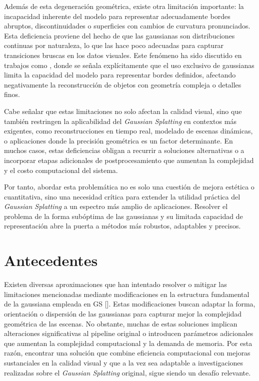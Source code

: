 Además de esta degeneración geométrica, existe otra limitación importante: la incapacidad inherente del modelo para representar adecuadamente 
bordes abruptos, discontinuidades o superficies con cambios de curvatura pronunciados. Esta deficiencia proviene del hecho de que las gaussianas 
son distribuciones continuas por naturaleza, lo que las hace poco adecuadas para capturar transiciones bruscas en los datos visuales. Este fenómeno 
ha sido discutido en trabajos como \cite{qu2024discgsdiscontinuityawaregaussiansplatting}, donde se señala explícitamente que el 
uso exclusivo de gaussianas limita la capacidad del modelo para representar bordes definidos, afectando negativamente la reconstrucción 
de objetos con geometría compleja o detalles finos.

Cabe señalar que estas limitaciones no solo afectan la calidad visual, sino que también restringen la aplicabilidad del \textit{Gaussian Splatting} en 
contextos más exigentes, como reconstrucciones en tiempo real, modelado de escenas dinámicas, o aplicaciones donde la precisión geométrica es 
un factor determinante. En muchos casos, estas deficiencias obligan a recurrir a soluciones alternativas o a incorporar etapas adicionales de 
postprocesamiento que aumentan la complejidad y el costo computacional del sistema.

Por tanto, abordar esta problemática no es solo una cuestión de mejora estética o cuantitativa, sino una necesidad crítica para extender la 
utilidad práctica del \textit{Gaussian Splatting} a un espectro más amplio de aplicaciones. Resolver el problema de la forma subóptima de las gaussianas 
y su limitada capacidad de representación abre la puerta a métodos más robustos, adaptables y precisos.

\section{Antecedentes}
Existen diversas aproximaciones que han intentado resolver o mitigar las limitaciones mencionadas mediante modificaciones en la estructura 
fundamental de la gaussiana empleada en GS 
[\cite{qu2024discgsdiscontinuityawaregaussiansplatting, li20243d, huang2025deformableradialkernelsplatting,held20243dconvexsplattingradiance}]. 
Estas modificaciones buscan adaptar la forma, orientación o dispersión de las gaussianas para capturar mejor la complejidad geométrica de las escenas. 
No obstante, muchas de estas soluciones implican alteraciones significativas al pipeline original o introducen parámetros adicionales que aumentan la 
complejidad computacional y la demanda de memoria. 
Por esta razón, encontrar una solución que combine eficiencia computacional con mejoras sustanciales en la calidad visual y que a la vez sea adaptable 
a investigaciones realizadas sobre el \textit{Gaussian Splatting} original, sigue siendo un desafío relevante.


